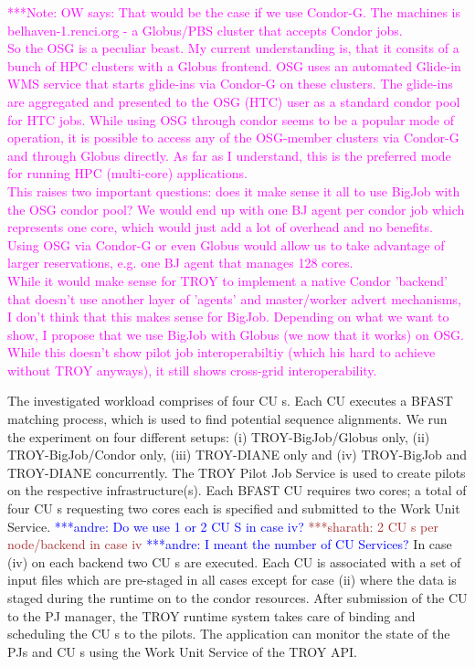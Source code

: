 \documentclass[conference,final]{IEEEtran}
\newcommand{\alnote}[1]{ {\textcolor{blue} { ***andre: #1 }}}
\newcommand{\smnote}[1]{ {\textcolor{brown} { ***sharath: #1 }}}
\newcommand{\note}[1]{ {\textcolor{magenta} { ***Note: #1 }}}
\newcommand{\alnote}[1]{}
\newcommand{\smnote}[1]{}
\newcommand{\note}[1]{}
\newcommand{\cu}{CU\xspace}
\begin{document}
\note{OW says: That would be the case if we use Condor-G. The machines
is belhaven-1.renci.org - a Globus/PBS cluster that accepts Condor jobs.\\
So the OSG is a peculiar beast. My current understanding is, that it consits 
of a bunch of HPC clusters with a Globus frontend. OSG uses an automated 
Glide-in WMS service that starts glide-ins via Condor-G on these clusters.
The glide-ins are aggregated and presented to the OSG (HTC) user as a 
standard condor pool for HTC jobs. While using OSG through condor seems 
to be a popular mode of operation, it is possible to access any of the 
OSG-member clusters via Condor-G and through Globus directly. As far as I
understand, this is the preferred mode for running HPC (multi-core) 
applications.\\
This raises two important questions: does it make sense it all to use
BigJob with the OSG condor pool? We would end up with one BJ agent per
condor job which represents one core, which would just add a lot of overhead and
no benefits. Using OSG via Condor-G or even Globus would allow us to
take advantage of larger reservations, e.g. one BJ agent that manages
128 cores.\\
While it would make sense for TROY to implement a native Condor 'backend'
that doesn't use another layer of 'agents' and master/worker advert 
mechanisms, I don't think that this makes sense for BigJob. Depending on 
what we want to show, I propose that we use BigJob with Globus (we now that 
it works) on OSG. While this doesn't show pilot job interoperabiltiy
(which his hard to achieve without TROY anyways), it still shows cross-grid
interoperability.}



The investigated workload comprises of four \cu s. Each \cu  executes a BFAST
matching process, which is used to find potential sequence alignments. We run
the experiment on four different setups: (i) TROY-BigJob/Globus only, (ii)
TROY-BigJob/Condor only, (iii) TROY-DIANE only and (iv) TROY-BigJob and
TROY-DIANE concurrently. The TROY Pilot Job Service is used to create pilots on
the respective infrastructure(s). Each BFAST \cu  requires two cores; a total of
four \cu s requesting two cores each is specified and submitted to the Work Unit
Service. 
\alnote{Do we use 1 or 2 \cu S in case iv? }   
\smnote{2 \cu s per node/backend in case iv }\alnote{I meant the number of \cu  
Services?}
 In case (iv) on each backend two \cu s are executed. 
 Each \cu  is associated with a set of input files which are pre-staged in 
 all cases except for case (ii) where the data is staged during the runtime on
 to the condor resources. After
submission of the \cu  to the PJ manager, the TROY runtime system takes care of
binding and scheduling the \cu s to the pilots. The application can monitor the
state of the PJs and \cu s using the Work Unit Service of the TROY API.
\end{document}
